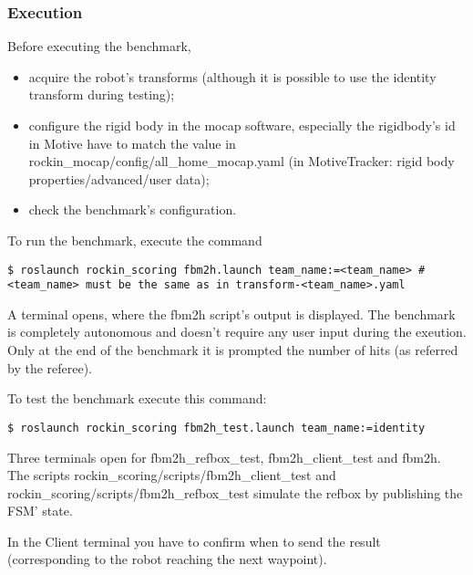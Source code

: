 \documentclass[a4paper]{article}
\begin{document}

\subsubsection{Execution}
\label{sec:fbm2h_execution}

Before executing the benchmark,
\begin{itemize}
  \item acquire the robot's transforms (although it is possible to use the identity transform during testing);
  \item configure the rigid body in the mocap software, especially the rigidbody's id in Motive have to match the value in rockin\_mocap/config/all\_home\_mocap.yaml (in MotiveTracker: rigid body properties/advanced/user data);
  \item check the benchmark's configuration.
\end{itemize}


To run the benchmark, execute the command
\begin{verbatim}
$ roslaunch rockin_scoring fbm2h.launch team_name:=<team_name> # <team_name> must be the same as in transform-<team_name>.yaml
\end{verbatim} 

A terminal opens, where the fbm2h script's output is displayed.
The benchmark is completely autonomous and doesn't require any user input during the exeution.
Only at the end of the benchmark it is prompted the number of hits (as referred by the referee).



To test the benchmark execute this command:
\begin{verbatim}
$ roslaunch rockin_scoring fbm2h_test.launch team_name:=identity
\end{verbatim} 

Three terminals open for fbm2h\_refbox\_test, fbm2h\_client\_test and fbm2h.
The scripts rockin\_scoring/scripts/fbm2h\_client\_test and rockin\_scoring/scripts/fbm2h\_refbox\_test simulate the refbox by publishing the FSM' state.

In the Client terminal you have to confirm when to send the result (corresponding to the robot reaching the next waypoint).


\end{document}
